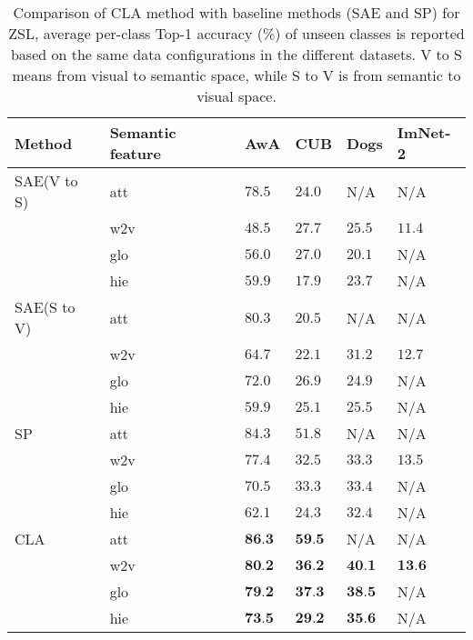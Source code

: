 \documentclass[review]{elsarticle}
\begin{document}
\begin{table}[!ht]
\small
\renewcommand{\arraystretch}{1.0}
\caption{Comparison of CLA method with baseline methods (SAE and SP) for ZSL, average per-class Top-1 accuracy (\%) of unseen classes is reported based on the same data configurations in the different datasets. V to S means from visual to semantic space, while S to V is from semantic to visual space.}
\label{table2}
\begin{center}
\newcommand{\tabincell}[2]{\begin{tabular}{@{}#1@{}}#2\end{tabular}}
\begin{tabular}{lp{2.3cm}p{1cm}p{1cm}p{1cm}p{1.8cm}}
\hline
\bfseries Method &\bfseries Semantic feature &\bfseries AwA &\bfseries CUB &\bfseries Dogs &\bfseries ImNet-2\\
\hline \hline
SAE(V to S)  & att &$78.5$ & $24.0$ & N/A & N/A\\
             & w2v &$48.5$ & $27.7$ & $25.5$ & $11.4$\\
             & glo &$56.0$ & $27.0$ & $20.1$ & N/A\\
             & hie &$59.9$ & $17.9$ & $23.7$ & N/A\\
\hline
SAE(S to V)  & att &$80.3$ & $20.5$ & N/A & N/A\\
             & w2v &$64.7$ & $22.1$ & $31.2$ & $12.7$\\
             & glo &$72.0$ & $26.9$ & $24.9$ & N/A\\
             & hie &$59.9$ & $25.1$ & $25.5$ & N/A\\
\hline
SP     & att &$84.3$ & $51.8$ & N/A & N/A\\
       & w2v &$77.4$ & $32.5$ & $33.3$ & $13.5$\\
       & glo &$70.5$ & $33.3$ & $33.4$ & N/A\\
       & hie &$62.1$ & $24.3$ & $32.4$ & N/A\\
\hline\hline
CLA  & att &$\textbf{86.3}$ & $\textbf{59.5}$ & N/A & N/A\\
     & w2v &$\textbf{80.2}$ & $\textbf{36.2}$ & $\textbf{40.1}$ & $\textbf{13.6}$\\
     & glo &$\textbf{79.2}$ & $\textbf{37.3}$ & $\textbf{38.5}$ & N/A\\
     & hie &$\textbf{73.5}$ & $\textbf{29.2}$ & $\textbf{35.6}$ & N/A\\
\hline
\end{tabular}
\end{center}
\end{table}
\end{document}
